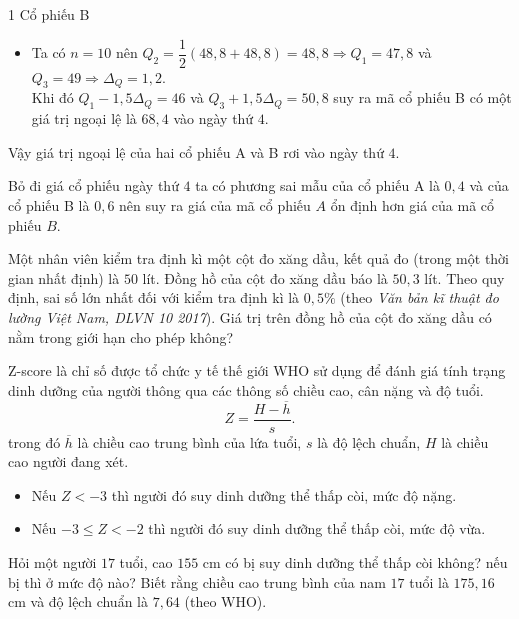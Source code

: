 \begin{bt}
{\begin{enumEX}[a)]{1}
			Cổ phiếu B
			\begin{itemize}
				\item Ta có $n=10$ nên  $Q_2=\dfrac{1}{2}\left(48{,}8+48{,}8 \right)=48{,}8 \Rightarrow Q_1=47{,}8$ và $Q_3=49\Rightarrow \Delta_Q=1{,}2$.\\
				Khi đó $Q_1-1{,}5\Delta_Q=46$ và $Q_3+1{,}5 \Delta_Q=50{,}8$ suy ra mã cổ phiếu B có một giá trị ngoại lệ là $68{,}4$ vào ngày thứ $4$.
			\end{itemize}
			Vậy giá trị ngoại lệ của hai cổ phiếu A và B rơi vào ngày thứ $4$.
			\item Bỏ đi giá cổ phiếu ngày thứ $4$ ta có phương sai mẫu của cổ phiếu A là $0{,}4$ và của cổ phiếu B là $0{,}6$
			nên suy ra giá của mã cổ phiếu $A$ ổn định hơn giá của mã cổ phiếu $B$.
		\end{enumEX}
	}
\end{bt}

\begin{bt}%
	Một nhân viên kiểm tra định kì một cột đo xăng dầu, kết quả đo (trong một thời gian nhất định) là $50$ lít. Đồng hồ của cột đo xăng dầu báo là $50{,}3$ lít. Theo quy định, sai số lớn nhất đối với kiểm tra định kì là $0{,}5\%$ (theo \textit{Văn bản kĩ thuật đo lường Việt Nam, DLVN 10  2017}). Giá trị trên đồng hồ của cột đo xăng dầu có nằm trong giới hạn cho phép không?
\end{bt}

\begin{bt}%
	Z-score là chỉ số được tổ chức y tế thế giới WHO sử dụng để đánh giá tính trạng dinh dưỡng của người thông qua các thông số chiều cao, cân nặng và độ tuổi.
	$$Z=\dfrac{H-\overline{h}}{s}.$$
	trong đó $\overline{h}$ là chiều cao trung bình của lứa tuổi, $s$ là độ lệch chuẩn, $H$ là chiều cao người đang xét. 
	\begin{itemize}
		\item Nếu $Z<-3$ thì người đó suy dinh dưỡng thể thấp còi, mức độ nặng.
		\item Nếu $-3\le Z< -2$ thì người đó suy dinh dưỡng thể thấp còi, mức độ vừa.
	\end{itemize}
	Hỏi một người $17$ tuổi, cao $155$ cm có bị suy dinh dưỡng thể thấp còi không? nếu bị thì ở mức độ nào? Biết rằng chiều cao trung bình của nam $17$ tuổi là $175{,}16$ cm và độ lệch chuẩn là $7{,}64$ (theo WHO).
\end{bt}

